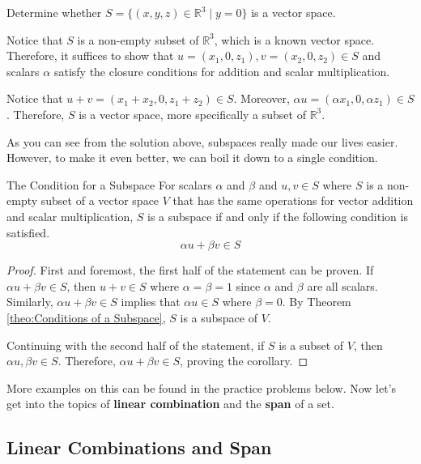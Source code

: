 \documentclass[../../main.tex]{subfiles}
\begin{document}
\begin{problem}{}{}
Determine whether $S = \{ (x, y, z) \in \mathbb{R}^3 \mid y = 0 \}$
is a vector space.
\end{problem}
\begin{solution}
Notice that $S$ is a non-empty subset of $\mathbb{R}^3$, which is a
known vector space. Therefore, it suffices to show that $u =
(x_1, 0, z_1), v = (x_2, 0, z_2) \in S$ and scalars $\alpha$ satisfy
the closure conditions for addition and scalar multiplication.

Notice that $u + v = (x_1 + x_2, 0, z_1 + z_2) \in S$. Moreover,
$\alpha u = (\alpha x_1, 0, \alpha z_1) \in S$. Therefore, $S$ is a
vector space, more specifically a subset of $\mathbb{R}^3$.
\end{solution}

As you can see from the solution above, subspaces really made our
lives easier. However, to make it even better, we can boil it down
to a single condition.

\begin{corollary}{}{The Condition for a Subspace}
For scalars $\alpha$ and $\beta$ and $u, v \in S$ where $S$ is a
non-empty subset of a vector space $V$ that has the same operations
for vector addition and scalar multiplication, $S$ is a subspace if
and only if the following condition is satisfied.
\[
\alpha u + \beta v \in S
\]
\end{corollary}
\begin{proof}
First and foremost, the first half of the statement can be proven.
If $\alpha u + \beta v \in S$, then $u + v \in S$ where $\alpha =
\beta = 1$ since $\alpha$ and $\beta$ are all scalars. Similarly,
$\alpha u + \beta v \in S$ implies that $\alpha u \in S$ where
$\beta = 0$. By Theorem \ref{theo:Conditions of a Subspace}, $S$ is a
subspace of $V$.

Continuing with the second half of the statement, if $S$ is a subset
of $V$, then $\alpha u, \beta v \in S$. Therefore, $\alpha u +
\beta v \in S$, proving the corollary.
\end{proof}

More examples on this can be found in the practice problems below.
Now let's get into the topics of \textbf{linear combination} and the
\textbf{span} of a set.

\subsection{Linear Combinations and Span}
\end{document}
